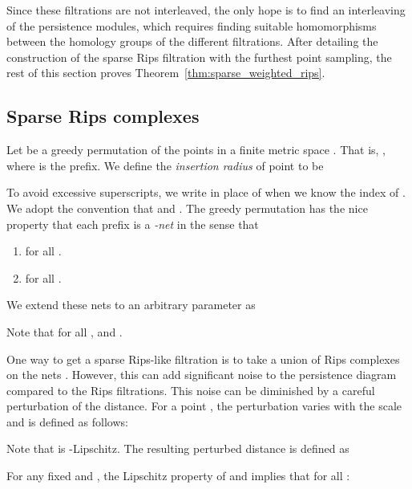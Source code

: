 \documentclass[a4paper]{article}
\begin{document}
Since these filtrations are not interleaved, the only hope is to find an interleaving of the persistence modules, which requires finding suitable homomorphisms between the homology groups of the different filtrations.
After detailing the construction of the sparse Rips filtration with the furthest point sampling, the rest of this section proves Theorem~\ref{thm:sparse_weighted_rips}.
\subsection{Sparse Rips complexes}\label{sec:sparse_rips_revisited}

Let  be a greedy permutation of the points  in a finite metric space .
That is, , where  is the  prefix.
  We define the \emph{insertion radius}  of point  to be
  
  
To avoid excessive superscripts, we write  in place of  when we know the index of .
We adopt the convention that  and .
The greedy permutation has the nice property that each prefix  is a \emph{-net} in the sense that 
  \begin{enumerate}
    \item      for all .
    \item       for all .
  \end{enumerate}
  We extend these nets to an arbitrary parameter  as
  
  Note that for all ,  and .
  
One way to get a sparse Rips-like filtration is to take a union of Rips complexes on the nets .
However, this can add significant noise to the persistence diagram compared to the Rips filtrations.
This noise can be diminished by a careful perturbation of the distance.
For a point , the perturbation varies with the scale and is defined as follows:
  
  
\begin{center}
\end{center}
  
  Note that  is -Lipschitz.
  The resulting perturbed distance is defined as
  
  
  For any fixed  and , the Lipschitz property of  and  implies that for all :
  
\end{document}
